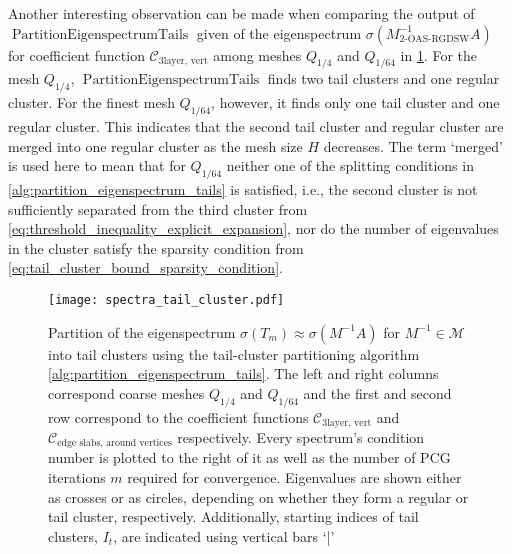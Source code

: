 Another interesting observation can be made when comparing the output of \newline$\operatorname{PartitionEigenspectrumTails}$ given of the eigenspectrum $\sigma(M_{\text{2-OAS-RGDSW}}^{-1}A)$ for coefficient function $\mathcal{C}_{\text{3layer, vert}}$ among meshes $Q_{1/4}$ and $Q_{1/64}$ in \cref{fig:partitioning_eigenspectrum_tails}. For the mesh $Q_{1/4}$, $\operatorname{PartitionEigenspectrumTails}$ finds two tail clusters and one regular cluster. For the finest mesh $Q_{1/64}$, however, it finds only one tail cluster and one regular cluster. This indicates that the second tail cluster and regular cluster are merged into one regular cluster as the mesh size $H$ decreases. The term `merged' is used here to mean that for $Q_{1/64}$ neither one of the splitting conditions in \cref{alg:partition_eigenspectrum_tails} is satisfied, i.e., the second cluster is not sufficiently separated from the third cluster from \cref{eq:threshold_inequality_explicit_expansion}, nor do the number of eigenvalues in the cluster satisfy the sparsity condition from \cref{eq:tail_cluster_bound_sparsity_condition}. 
\begin{figure}[H]
    \centering
    \texttt{[image: spectra\_tail\_cluster.pdf]}
    \caption{Partition of the eigenspectrum $\sigma(T_m)\approx\sigma(M^{-1}A)$ for $M^{-1}\in\mathcal{M}$ into tail clusters using the tail-cluster partitioning algorithm \cref{alg:partition_eigenspectrum_tails}. The left and right columns correspond coarse meshes $Q_{1/4}$ and $Q_{1/64}$ and the first and second row correspond to the coefficient functions $\mathcal{C}_{\text{3layer, vert}}$ and $\mathcal{C}_{\text{edge slabs, around vertices}}$ respectively. Every spectrum's condition number is plotted to the right of it as well as the number of PCG iterations $m$ required for convergence. Eigenvalues are shown either as crosses or as circles, depending on whether they form a regular or tail cluster, respectively. Additionally, starting indices of tail clusters, $I_t$, are indicated using vertical bars `|'}
    \label{fig:partitioning_eigenspectrum_tails}
\end{figure}

